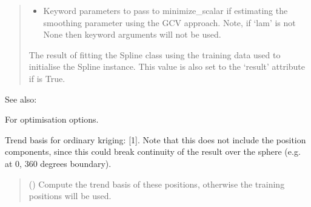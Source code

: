 \documentclass[letterpaper,10pt,english]{sphinxmanual}
\begin{document}
\begin{fulllineitems}
\begin{fulllineitems}
\begin{quote}
\begin{description}
\begin{itemize}
\item {}
\sphinxAtStartPar
{} \textendash{} Keyword parameters to pass to minimize\_scalar if estimating the
smoothing parameter using the GCV approach. Note, if ‘lam’ is not
None then keyword arguments will not be used.

\end{itemize}

\sphinxAtStartPar
{} \textendash{} The result of fitting the Spline class using the training data used
to initialise the Spline instance. This value is also set to the
‘result’ attribute if  is True.

\sphinxAtStartPar
{}

\end{description}\end{quote}


\begin{sphinxseealso}{See also:}
\begin{description}
\sphinxAtStartPar
For optimisation options.

\end{description}


\end{sphinxseealso}


\end{fulllineitems}


\begin{fulllineitems}
\label{\detokenize{splines:glomar_gridding.spline.SphericalThinPlateSpline.get_trend_basis}}
\pysigstartsignatures
\pysiglinewithargsret
{}
{}
{}
\pysigstopsignatures
\sphinxAtStartPar
Trend basis for ordinary kriging: {[}1{]}. Note that this does not include
the position components, since this could break continuity of the result
over the sphere (e.g. at 0, 360 degrees boundary).
\begin{quote}\begin{description}
\sphinxAtStartPar
{} () \textendash{} Compute the trend basis of these positions, otherwise the training
positions will be used.


\end{description}
\end{quote}
\end{fulllineitems}
\end{fulllineitems}
\end{document}
